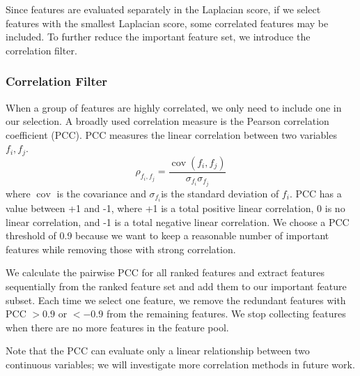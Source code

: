 Since features are evaluated separately in the Laplacian score, if we select features with the smallest Laplacian score, some correlated features may be included. To further reduce the important feature set,  we introduce the correlation filter.

\subsubsection{Correlation Filter}
When a group of features are highly correlated, we only need to include one in our selection. A broadly used correlation measure is the Pearson correlation coefficient (PCC). PCC measures the linear correlation between two variables $f_{i}, f_{j}$. 
\begin{equation}
\rho_{f_{i}, f_{j}}=\frac{\operatorname{cov}(f_{i}, f_{j})}{\sigma_{f_{i}} \sigma_{f_{j}}}
\end{equation}
where $\operatorname{cov}$ is the covariance and $\sigma_{f_{i}}$is the standard deviation of $f_{i}$.
PCC has a value between +1 and -1, where +1 is a total positive linear correlation, 0 is no linear correlation, and -1 is a total negative linear correlation. We choose a PCC threshold of 0.9 because we want to keep a reasonable number of important features while removing those with strong correlation.  

We calculate the pairwise PCC for all ranked features and extract features sequentially from the ranked feature set and add them to our important feature subset. Each time we select one feature, we remove the redundant features with PCC $> 0.9$ or $< -0.9$ from the remaining features. We stop collecting features when there are no more features in the feature pool. %

Note that the PCC can evaluate only a linear relationship between two continuous variables; we will investigate more correlation methods in future work.